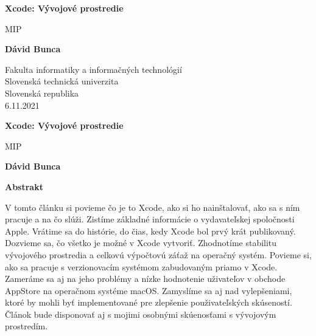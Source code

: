 \documentclass[12pt]{article}
\begin{document}
	\begin{titlepage}
   		 \begin{center}
        
            
      			  \Huge
      			  \textbf{Xcode: Vývojové prostredie}
            
     			   \vspace{0.5cm}
        			  \LARGE
				MIP
        
            
       			 \vspace{1.5cm}
            
       			 \textbf{Dávid Bunca}
            
       			 \vfill
            
            
       			 \vspace{0.8cm}

        			\centering   
            
       			 \Large
       			 Fakulta informatiky a informačných technológií\\
        			Slovenská technická univerzita\\
       			Slovenská republika\\
        			6.11.2021
            
   		 \end{center}
	\end{titlepage}

	\begin{center}
   		 \Large
    		\textbf{Xcode: Vývojové prostredie}
        
   		 \vspace{0.4cm}
    		\large
    		MIP
        
   		 \vspace{0.4cm}
    		\textbf{Dávid Bunca}
       
  		  \vspace{0.9cm}
    		\textbf{Abstrakt}
	\end{center}

			V tomto článku si povieme čo je to Xcode, ako si ho nainštalovať, ako sa s ním pracuje a na čo slúži. Zistíme základné informácie o vydavateľskej spoločnosti Apple. Vrátime sa do histórie, do čias, kedy Xcode bol prvý krát publikovaný. Dozvieme sa, čo všetko je možné v Xcode vytvoriť. Zhodnotíme stabilitu vývojového prostredia a celkovú výpočtovú záťaž na operačný systém. Povieme si, ako sa pracuje s verzionovacím systémom zabudovaným priamo v Xcode. Zameráme sa aj na jeho problémy a nízke hodnotenie uživateľov v obchode AppStore na operačnom systéme macOS. Zamyslíme sa aj nad vylepšeniami, ktoré by mohli byť implementované pre zlepšenie použivateľských skúseností. Článok bude disponovať aj s mojimi osobnými skúenosťami s vývojovým prostredím.
\end{document}
